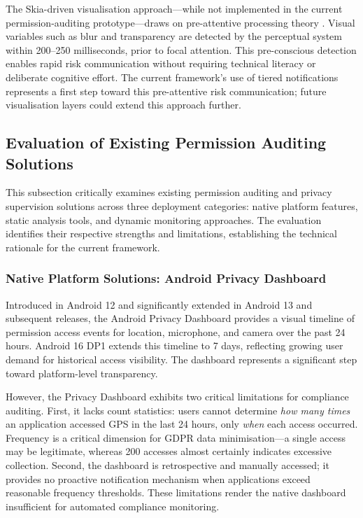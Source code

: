 The Skia-driven visualisation approach—while not implemented in the current permission-auditing prototype—draws on pre-attentive processing theory \cite{30, 31, 29}. Visual variables such as blur and transparency are detected by the perceptual system within 200–250 milliseconds, prior to focal attention. This pre-conscious detection enables rapid risk communication without requiring technical literacy or deliberate cognitive effort. The current framework's use of tiered notifications represents a first step toward this pre-attentive risk communication; future visualisation layers could extend this approach further.

\subsection{Evaluation of Existing Permission Auditing Solutions}
This subsection critically examines existing permission auditing and privacy supervision solutions across three deployment categories: native platform features, static analysis tools, and dynamic monitoring approaches. The evaluation identifies their respective strengths and limitations, establishing the technical rationale for the current framework.

\subsubsection{Native Platform Solutions: Android Privacy Dashboard}
Introduced in Android 12 and significantly extended in Android 13 and subsequent releases, the Android Privacy Dashboard provides a visual timeline of permission access events for location, microphone, and camera over the past 24 hours. Android 16 DP1 extends this timeline to 7 days, reflecting growing user demand for historical access visibility. The dashboard represents a significant step toward platform-level transparency.

However, the Privacy Dashboard exhibits two critical limitations for compliance auditing. First, it lacks count statistics: users cannot determine \emph{how many times} an application accessed GPS in the last 24 hours, only \emph{when} each access occurred. Frequency is a critical dimension for GDPR data minimisation—a single access may be legitimate, whereas 200 accesses almost certainly indicates excessive collection. Second, the dashboard is retrospective and manually accessed; it provides no proactive notification mechanism when applications exceed reasonable frequency thresholds. These limitations render the native dashboard insufficient for automated compliance monitoring.

